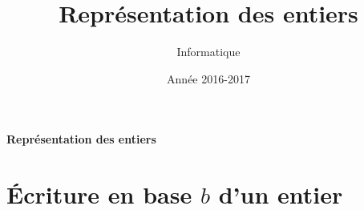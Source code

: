 



\author{Informatique}  %
\title{Représentation des entiers}  %
\date{Année 2016-2017} %
\renewcommand{\thesection}{\Roman{section}}  %
\pagestyle{fancy}



\fancyfoot[C]{\thepage} %
\fancyfoot[L]{} %
\fancyfoot[R]{} %
\newcommand{\p}[1]{ \left( #1 \right)}   %
\newcommand\abs[1]{|{#1}|}
\newcommand{\intent}[2]{[\![ #1 , #2 ]\!]} %
\newcommand{\pe}[1]{ \left\lfloor #1 \right\rfloor} %

\rule[0pt]{0pt}{0pt}
\vspace{0.2cm}
\begin{center}
{\LARGE\bf Représentation des entiers}
\end{center}
\thispagestyle{empty}
\vskip 1cm
\renewcommand{\abstractname}{Introduction\hfill}

\section{{\'E}criture en base $b$ d'un entier}

